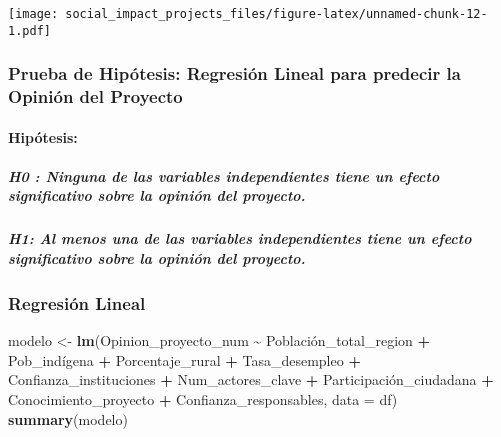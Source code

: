 \documentclass[
]{article}
\newenvironment{Shaded}{\begin{snugshade}}{\end{snugshade}}
\newcommand{\AttributeTok}[1]{\textcolor[rgb]{0.13,0.29,0.53}{#1}}
\newcommand{\FunctionTok}[1]{\textcolor[rgb]{0.13,0.29,0.53}{\textbf{#1}}}
\newcommand{\NormalTok}[1]{#1}
\newcommand{\OtherTok}[1]{\textcolor[rgb]{0.56,0.35,0.01}{#1}}
\newcommand{\SpecialCharTok}[1]{\textcolor[rgb]{0.81,0.36,0.00}{\textbf{#1}}}
\begin{document}
\texttt{[image: social\_impact\_projects\_files/figure-latex/unnamed-chunk-12-1.pdf]}

\subsubsection{\texorpdfstring{\textbf{Prueba de Hipótesis:} Regresión
Lineal para predecir la Opinión del
Proyecto}{Prueba de Hipótesis: Regresión Lineal para predecir la Opinión del Proyecto}}\label{prueba-de-hipuxf3tesis-regresiuxf3n-lineal-para-predecir-la-opiniuxf3n-del-proyecto}

\paragraph{Hipótesis:}\label{hipuxf3tesis-1}

\subparagraph{H0 : Ninguna de las variables independientes tiene un
efecto significativo sobre la opinión del
proyecto.}\label{h0-ninguna-de-las-variables-independientes-tiene-un-efecto-significativo-sobre-la-opiniuxf3n-del-proyecto.}

\subparagraph{H1: Al menos una de las variables independientes tiene un
efecto significativo sobre la opinión del
proyecto.}\label{h1-al-menos-una-de-las-variables-independientes-tiene-un-efecto-significativo-sobre-la-opiniuxf3n-del-proyecto.}

\subsubsection{\texorpdfstring{\textbf{Regresión
Lineal}}{Regresión Lineal}}\label{regresiuxf3n-lineal}

\begin{Shaded}
\begin{Highlighting}[]
\NormalTok{modelo }\OtherTok{\textless{}{-}} \FunctionTok{lm}\NormalTok{(Opinion\_proyecto\_num }\SpecialCharTok{\textasciitilde{}}\NormalTok{ Población\_total\_region }\SpecialCharTok{+}\NormalTok{ Pob\_indígena }\SpecialCharTok{+}\NormalTok{ Porcentaje\_rural }\SpecialCharTok{+} 
\NormalTok{               Tasa\_desempleo }\SpecialCharTok{+}\NormalTok{ Confianza\_instituciones }\SpecialCharTok{+}\NormalTok{ Num\_actores\_clave }\SpecialCharTok{+} 
\NormalTok{               Participación\_ciudadana }\SpecialCharTok{+}\NormalTok{ Conocimiento\_proyecto }\SpecialCharTok{+}\NormalTok{ Confianza\_responsables, }
             \AttributeTok{data =}\NormalTok{ df)}
\FunctionTok{summary}\NormalTok{(modelo)}
\end{Highlighting}
\end{Shaded}
\end{document}
